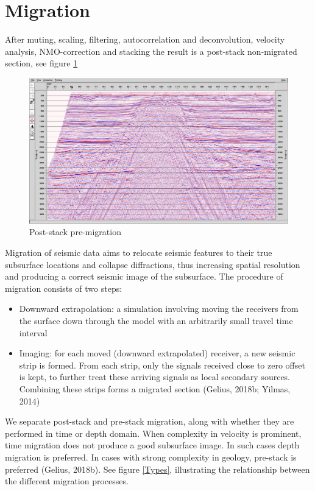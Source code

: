 \documentclass[10pt,a4paper]{article}
\begin{document}
\newpage

\section{Migration}

After muting, scaling, filtering, autocorrelation and deconvolution, velocity analysis, NMO-correction and stacking the result is a post-stack non-migrated section, see figure \ref{fmig}

\begin{figure}[H]
\includegraphics[width=\textwidth]{fmig.jpg}
\caption{Post-stack pre-migration}
\label{fmig}
\end{figure}

\noindent Migration of seismic data aims to relocate seismic features to their true subsurface locations and collapse diffractions, thus increasing spatial resolution and producing a correct seismic image of the subsurface. The procedure of migration consists of two steps:

\begin{itemize}
    \item Downward extrapolation: a simulation involving moving the receivers from the surface down through the model with an arbitrarily small travel time interval
    \item Imaging: for each moved (downward extrapolated) receiver, a new seismic strip is formed. From each strip, only the signals received close to zero offset is kept, to further treat these arriving signals as local secondary sources. Combining these strips forms a migrated section (Gelius, 2018b; Yilmas, 2014)
\end{itemize}

\noindent We separate post-stack and pre-stack migration, along with whether they are performed in time or depth domain. When complexity in velocity is prominent, time migration does not produce a good subsurface image. In such cases depth migration is preferred. In cases with strong complexity in geology, pre-stack is preferred (Gelius, 2018b). See figure \ref{Types}, illustrating the relationship between the different migration processes.
\end{document}
